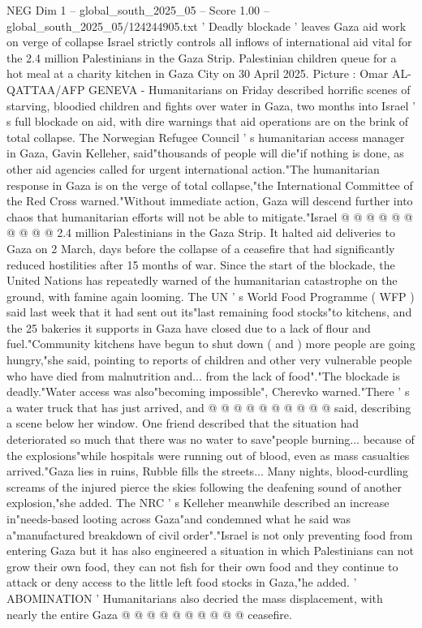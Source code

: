 \begin{textsample}{NEG Dim 1 – global\_south\_2025\_05 – Score 1.00 – global\_south\_2025\_05/124244905.txt}  \label{ex:f1_neg_167}
' Deadly blockade ' leaves Gaza aid work on verge of collapse Israel strictly controls all inflows of international aid vital for the 2.4 million Palestinians in the Gaza Strip.
Palestinian children queue for a hot meal at a charity kitchen in Gaza City on 30 April 2025.
Picture : Omar AL-QATTAA/AFP GENEVA - Humanitarians on Friday described horrific scenes of starving, bloodied children and fights over water in Gaza, two months into Israel ' s full blockade on aid, with dire warnings that aid operations are on the brink of total collapse.
The Norwegian Refugee Council ' s humanitarian access manager in Gaza, Gavin Kelleher, said"thousands of people will die"if nothing is done, as other aid agencies called for urgent international action."The humanitarian response in Gaza is on the verge of total collapse,"the International Committee of the Red Cross warned."Without immediate action, Gaza will descend further into chaos that humanitarian efforts will not be able to mitigate."Israel @ @ @ @ @ @ @ @ @ @ 2.4 million Palestinians in the Gaza Strip.
It halted aid deliveries to Gaza on 2 March, days before the collapse of a ceasefire that had significantly reduced hostilities after 15 months of war.
Since the start of the blockade, the United Nations has repeatedly warned of the humanitarian catastrophe on the ground, with famine again looming.
The UN ' s World Food Programme ( WFP ) said last week that it had sent out its"last remaining food stocks"to kitchens, and the 25 bakeries it supports in Gaza have closed due to a lack of flour and fuel."Community kitchens have begun to shut down ( and ) more people are going hungry,"she said, pointing to reports of children and other very vulnerable people who have died from malnutrition and... from the lack of food"."The blockade is deadly."Water access was also"becoming impossible", Cherevko warned."There ' s a water truck that has just arrived, and @ @ @ @ @ @ @ @ @ @ said, describing a scene below her window.
One friend described that the situation had deteriorated so much that there was no water to save"people burning... because of the explosions"while hospitals were running out of blood, even as mass casualties arrived."Gaza lies in ruins, Rubble fills the streets...
Many nights, blood-curdling screams of the injured pierce the skies following the deafening sound of another explosion,"she added.
The NRC ' s Kelleher meanwhile described an increase in"needs-based looting across Gaza"and condemned what he said was a"manufactured breakdown of civil order"."Israel is not only preventing food from entering Gaza but it has also engineered a situation in which Palestinians can not grow their own food, they can not fish for their own food and they continue to attack or deny access to the little left food stocks in Gaza,"he added. ' ABOMINATION ' Humanitarians also decried the mass displacement, with nearly the entire Gaza @ @ @ @ @ @ @ @ @ @ ceasefire.

\end{textsample}
